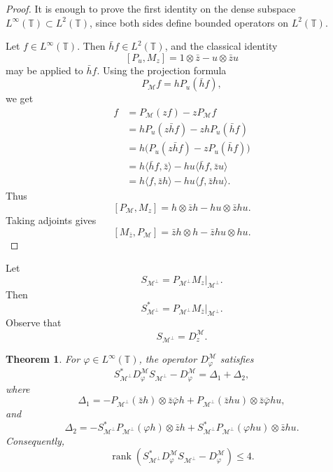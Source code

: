 \documentclass[12pt]{amsart}
\newtheorem{theorem}{Theorem}[section]
\theoremstyle{definition}
\theoremstyle{remark}
\def \T{\mathbb{T}}
\newcommand{\clm}{\mathcal{M}}
\newcommand{\vp}{\varphi}
\numberwithin{equation}{section}
\begin{document}
\begin{proof}
It is enough to prove the first identity on the dense subspace
$L^\infty(\T)\subset L^2(\T)$, since both sides define bounded operators on $L^2(\T)$.

Let $f\in L^\infty(\T)$. Then $\bar h f\in L^2(\T)$, and the classical identity
\[
[P_u,M_z]=1\otimes \bar z-u\otimes \bar z u
\]
may be applied to $\bar h f$. Using the projection formula
\[
P_\clm f=hP_u(\bar h f),
\]
we get
\begin{align*}
[P_\clm,M_z]f
&=
P_\clm(zf)-zP_\clm f  \\
&=
hP_u(z\bar h f)-zhP_u(\bar h f) \\
&=
h\big(P_u(z\bar h f)-zP_u(\bar h f)\big) \\
&=
h\langle \bar h f,\bar z\rangle
-
hu\langle \bar h f,\bar z u\rangle  \\
&=
h\langle f,\bar z h\rangle
-
hu\langle f,\bar zhu\rangle.
\end{align*}
Thus
\[
[P_\clm,M_z]
=
h\otimes \bar zh-hu\otimes \bar zhu.
\]
Taking adjoints gives
\[
[M_{\bar z},P_\clm]
=
\bar zh\otimes h-\bar zhu\otimes hu.
\]
\end{proof}


Let
\[
S_{\clm^\perp}=P_{\clm^\perp}M_z\big|_{\clm^\perp}.
\]
Then
\[
S_{\clm^\perp}^*
=
P_{\clm^\perp}M_{\bar{z}}\big|_{\clm^\perp}.
\]
Observe that
\[
S_{\clm^\perp}=D_z^\clm.
\]
\begin{theorem}\label{thm:shift_defect}
For $\vp\in L^\infty(\T)$, the operator $D_\vp^\clm$ satisfies
\[
S_{\clm^\perp}^*D_\vp^\clm S_{\clm^\perp}
-
D_\vp^\clm
=
\Delta_1+\Delta_2,
\]
where
\[
\Delta_1
=
-
P_{\clm^\perp}(\bar{z} h)\otimes \bar{z}\bar\vp h
+
P_{\clm^\perp}(\bar{z} hu)\otimes \bar{z}\bar\vp hu,
\]
and
\[
\Delta_2
=
-
S_{\clm^\perp}^*P_{\clm^\perp}(\vp h)\otimes \bar{z} h
+
S_{\clm^\perp}^*P_{\clm^\perp}(\vp hu)\otimes \bar{z} hu.
\]
Consequently,
\[
\operatorname{rank}
\left(
S_{\clm^\perp}^*D_\vp^\clm S_{\clm^\perp} - D_\vp^\clm
\right) \leq 4.
\]
\end{theorem}
\end{document}
